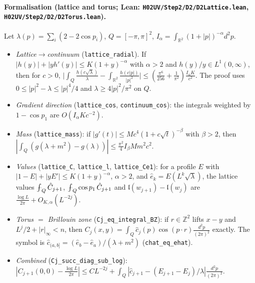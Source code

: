 \documentclass[11pt]{amsart}
\theoremstyle{definition}
\theoremstyle{remark}
\numberwithin{equation}{section}
\newcommand{\Z}{\mathbb{Z}}
\newcommand{\R}{\mathbb{R}}
\newcommand{\avint}{\mathop{\,\rlap{--}\!\!\int}\nolimits}
\begin{document}
\paragraph{Formalisation (lattice and torus; Lean: \texttt{H02UV/Step2/D2/D2Lattice.lean}, \texttt{H02UV/Step2/D2/D2Torus.lean}).}
Let $\lambda(p)=\sum_i(2-2\cos p_i)$, $Q=[-\pi,\pi]^2$, $I_\alpha=\int_{\R^2}(1+|p|)^{-\alpha}d^2p$.
\begin{itemize}
\item \emph{Lattice$\to$continuum} (\texttt{lattice\_radial}). If $|h(y)|+|yh'(y)|\le K(1+y)^{-\alpha}$ with
  $\alpha>2$ and $h(y)/y\in L^1(0,\infty)$, then for $c>0$,
  $\bigl|\int_Q\frac{h(c\sqrt\lambda)}{\lambda}-\int_{\R^2}\frac{h(c|p|)}{|p|^2}\bigr|\le
  (\frac{\pi^6}{256}+\frac1{\pi^2})\frac{I_\alpha K}{c^2}$. The proof uses $0\le|p|^2-\lambda\le|p|^4/4$ and
  $\lambda\ge4|p|^2/\pi^2$ on $Q$.
\item \emph{Gradient direction} (\texttt{lattice\_cos}, \texttt{continuum\_cos}): the integrals
  weighted by $1-\cos p_1$ are $O(I_\alpha Kc^{-2})$.
\item \emph{Mass} (\texttt{lattice\_mass}): if $|g'(t)|\le Mc^4(1+c\sqrt t)^{-\beta}$ with $\beta>2$, then
  $|\int_Q(g(\lambda+m^2)-g(\lambda))|\le\frac{\pi^2}{4}I_\beta Mm^2c^2$.
\item \emph{Values} (\texttt{lattice\_C}, \texttt{lattice\_l}, \texttt{lattice\_Ce1}): for a profile $E$
  with $|1-E|+|yE'|\le K(1+y)^{-\alpha}$, $\alpha>2$, and $\hat e_k=E(L^k\sqrt\lambda)$, the lattice
  values $\avint_Q\hat C_{j+1}$, $\avint_Q\cos p_1\,\hat C_{j+1}$ and
  $\mathfrak l(w_{j+1})-\mathfrak l(w_j)$ are $\frac{\log L}{2\pi}+O_{K,\alpha}(L^{-2j})$.
\item \emph{Torus $=$ Brillouin zone} (\texttt{Cj\_eq\_integral\_BZ}): if $r\in\Z^2$ lifts $x-y$
  and $L^j/2+|r|_\infty<n$, then $C_j(x,y)=\int_Q\hat c_j(p)\cos(p\cdot r)\frac{d^2p}{(2\pi)^2}$ exactly.
  The symbol is $\hat c_{(a,b]}=(\hat e_b-\hat e_a)/(\lambda+m^2)$ (\texttt{chat\_eq\_ehat}).
\item \emph{Combined} (\texttt{Cj\_succ\_diag\_sub\_log}): $|C_{j+1}(0,0)-\frac{\log L}{2\pi}|\le
  CL^{-2j}+\int_Q|\hat c_{j+1}-(E_{j+1}-E_j)/\lambda|\frac{d^2p}{(2\pi)^2}$.
\end{itemize}
\end{document}
